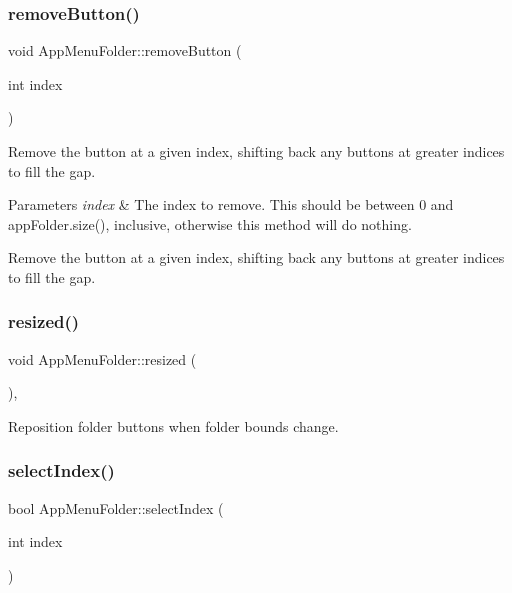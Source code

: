 \subsubsection{\texorpdfstring{remove\+Button()}{removeButton()}}
{\footnotesize\ttfamily void App\+Menu\+Folder\+::remove\+Button (\begin{DoxyParamCaption}\item[{int}]{index }\end{DoxyParamCaption})}

Remove the button at a given index, shifting back any buttons at greater indices to fill the gap.


\begin{DoxyParams}{Parameters}
{\em index} & The index to remove. This should be between 0 and app\+Folder.\+size(), inclusive, otherwise this method will do nothing.\\
\hline
\end{DoxyParams}
Remove the button at a given index, shifting back any buttons at greater indices to fill the gap. \mbox{\label{classAppMenuFolder_a6f26d51ceaad1e1bb1aa0753fbe7e02f}} 
\subsubsection{\texorpdfstring{resized()}{resized()}}
{\footnotesize\ttfamily void App\+Menu\+Folder\+::resized (\begin{DoxyParamCaption}{ }\end{DoxyParamCaption})\hspace{0.3cm}{\ttfamily [override]}, {\ttfamily [protected]}}

Reposition folder buttons when folder bounds change. \mbox{\label{classAppMenuFolder_abee7d3028394ad270be8d61b28d8c142}} 
\subsubsection{\texorpdfstring{select\+Index()}{selectIndex()}}
{\footnotesize\ttfamily bool App\+Menu\+Folder\+::select\+Index (\begin{DoxyParamCaption}\item[{int}]{index }\end{DoxyParamCaption})}

